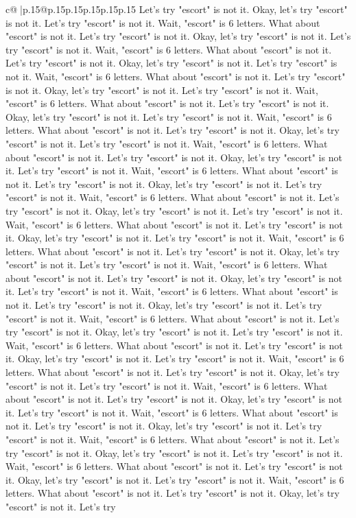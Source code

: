 \documentclass{article}
\begin{document}
{\begin{supertabular}{c@{$\;$}|p{.15\linewidth}@{}p{.15\linewidth}p{.15\linewidth}p{.15\linewidth}p{.15\linewidth}p{.15\linewidth}}
{{{Let's try "escort" is not it. Okay, let's try "escort" is not it. Let's try "escort" is not it. Wait, "escort" is 6 letters. What about "escort" is not it. Let's try "escort" is not it. Okay, let's try "escort" is not it. Let's try "escort" is not it. Wait, "escort" is 6 letters. What about "escort" is not it. Let's try "escort" is not it. Okay, let's try "escort" is not it. Let's try "escort" is not it. Wait, "escort" is 6 letters. What about "escort" is not it. Let's try "escort" is not it. Okay, let's try "escort" is not it. Let's try "escort" is not it. Wait, "escort" is 6 letters. What about "escort" is not it. Let's try "escort" is not it. Okay, let's try "escort" is not it. Let's try "escort" is not it. Wait, "escort" is 6 letters. What about "escort" is not it. Let's try "escort" is not it. Okay, let's try "escort" is not it. Let's try "escort" is not it. Wait, "escort" is 6 letters. What about "escort" is not it. Let's try "escort" is not it. Okay, let's try "escort" is not it. Let's try "escort" is not it. Wait, "escort" is 6 letters. What about "escort" is not it. Let's try "escort" is not it. Okay, let's try "escort" is not it. Let's try "escort" is not it. Wait, "escort" is 6 letters. What about "escort" is not it. Let's try "escort" is not it. Okay, let's try "escort" is not it. Let's try "escort" is not it. Wait, "escort" is 6 letters. What about "escort" is not it. Let's try "escort" is not it. Okay, let's try "escort" is not it. Let's try "escort" is not it. Wait, "escort" is 6 letters. What about "escort" is not it. Let's try "escort" is not it. Okay, let's try "escort" is not it. Let's try "escort" is not it. Wait, "escort" is 6 letters. What about "escort" is not it. Let's try "escort" is not it. Okay, let's try "escort" is not it. Let's try "escort" is not it. Wait, "escort" is 6 letters. What about "escort" is not it. Let's try "escort" is not it. Okay, let's try "escort" is not it. Let's try "escort" is not it. Wait, "escort" is 6 letters. What about "escort" is not it. Let's try "escort" is not it. Okay, let's try "escort" is not it. Let's try "escort" is not it. Wait, "escort" is 6 letters. What about "escort" is not it. Let's try "escort" is not it. Okay, let's try "escort" is not it. Let's try "escort" is not it. Wait, "escort" is 6 letters. What about "escort" is not it. Let's try "escort" is not it. Okay, let's try "escort" is not it. Let's try "escort" is not it. Wait, "escort" is 6 letters. What about "escort" is not it. Let's try "escort" is not it. Okay, let's try "escort" is not it. Let's try "escort" is not it. Wait, "escort" is 6 letters. What about "escort" is not it. Let's try "escort" is not it. Okay, let's try "escort" is not it. Let's try "escort" is not it. Wait, "escort" is 6 letters. What about "escort" is not it. Let's try "escort" is not it. Okay, let's try "escort" is not it. Let's try "escort" is not it. Wait, "escort" is 6 letters. What about "escort" is not it. Let's try "escort" is not it. Okay, let's try "escort" is not it. Let's try "escort" is not it. Wait, "escort" is 6 letters. What about "escort" is not it. Let's try "escort" is not it. Okay, let's try "escort" is not it. Let's try }}}
\end{supertabular}}
\end{document}
